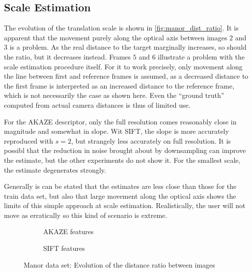 \subsection{Scale Estimation}

The evolution of the translation scale is shown in \autoref{fig:manor_dist_ratio}.
It is apparent that the movement purely along the optical axis between images
$2$ and $3$ is a problem. As the real distance to the target marginally
increases, so should the ratio, but it decreases instead. Frames $5$ and $6$
illustrate a problem with the scale estimation procedure itself. For it to work
precisely, only movement along the line between first and reference frames is
assumed, as a decreased distance to the first frame is interpreted as an
increased distance to the reference frame, which is not necessarily the case as
shown here. Even the ``ground truth'' computed from actual camera distances is thus
of limited use.

For the AKAZE descriptor, only the full resolution comes reasonably close in
magnitude and somewhat in slope. Wit SIFT, the slope is more accurately
reproduced with $s=2$, but strangely less accurately on full resolution. It is
possibl that the reduction in noise brought about by downsampling can improve
the estimate, but the other experiments do not show it. For the
smallest scale, the estimate degenerates strongly.

Generally is can be stated that the estimates are less close than those for the
train data set, but also that large movement along the optical axis shows the
limits of this simple approach at scale estimation. Realistically, the user will
not move as erratically so this kind of scenario is extreme.

\begin{figure}[h]
   \begin{subfigure}[b]{.5\linewidth}
      \centering      
      
      \caption{AKAZE features}
      \label{fig:manor_KAZE_dist_ratio}
   \end{subfigure}
   \quad\begin{subfigure}[b]{.5\linewidth}
      \centering      
      
      \caption{SIFT features}
      \label{fig:manor_SIFT_dist_ratio}
   \end{subfigure}
   \caption[Manor Data: distance ratio]{Manor data set: Evolution of the distance ratio between images}
   \label{fig:manor_dist_ratio}
\end{figure}

